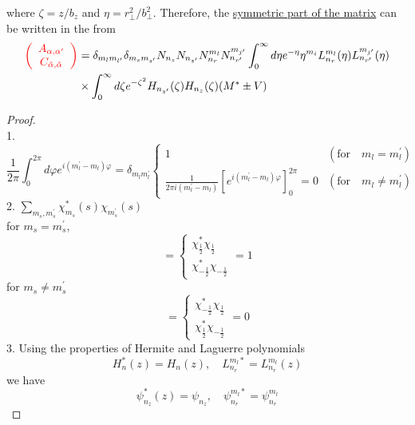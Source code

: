   where $\zeta = z/b_z$ and $\eta = r_{\perp}^2/b_{\perp}^2$. Therefore, the \underline{symmetric part of the matrix} can be written in the from
  \begin{equation}
    \begin{aligned}
      \textcolor{red}{\left(\begin{array}{c}
        A_{\alpha, \alpha^{\prime}} \\
        C_{\tilde{\alpha}, \tilde{\alpha}}
      \end{array}\right)} &=\delta_{m_{l} m_{l^{\prime}}} \delta_{m_{s} m_{s^{\prime}}} N_{n_{z}} N_{n_{z^{\prime}}} N_{n_{r}}^{m_{l}} N_{n_{r^{\prime}}}^{m_{j^{\prime}}} \int_{0}^{\infty} d \eta e^{-\eta} \eta^{m_{i}} L_{n_{r}}^{m_{l}}(\eta) L_{n_{r^{\prime}}}^{m_{j^{\prime}}}(\eta) \\
      & \times \int_{0}^{\infty} d \zeta e^{-\zeta^{2}} H_{n_{z^{\prime}}}(\zeta) H_{n_{z}}(\zeta)(M^\ast \pm V)
    \end{aligned}
  \end{equation}
  \begin{proof}
    \\1. 
    \begin{equation}
      \frac{1}{2\pi} \int_{0}^{2\pi} d\varphi e^{i(m_l^{\prime} - m_l)\varphi} = \delta_{m_l m_l^{\prime}}
      \begin{cases}
        1 & (\text{for} \quad m_l = m_l^{\prime})  \\
        \frac{1}{2\pi i(m_l^{\prime} - m_l)} \left[e^{i(m_l^{\prime} -m_l) \varphi}\right]_0^{2\pi}= 0 & (\text{for} \quad m_l \neq m_l^{\prime})
      \end{cases}
    \end{equation}
    2. $\sum_{m_s, m_{s}^\prime} \chi_{m_s}^{\ast}(s)\chi_{m_s^{\prime}}(s)$\\
    for $m_s = m_s^{\prime}$,
    \begin{equation}
      =
      \begin{cases}
        \chi_{\frac{1}{2}}^{\ast}\chi_{\frac{1}{2}} \\
        \chi_{-\frac{1}{2}}^{\ast}\chi_{-\frac{1}{2}}
      \end{cases}
      =1
    \end{equation}
    for $m_s \neq m_s^{\prime}$
    \begin{equation}
      =
      \begin{cases}
        \chi_{-\frac{1}{2}}^{\ast}\chi_{\frac{1}{2}} \\
        \chi_{\frac{1}{2}}^{\ast}\chi_{-\frac{1}{2}}
      \end{cases}
      =0
    \end{equation}
    3. Using the properties of Hermite and Laguerre polynomials
    \begin{equation*}
      H_n^{\ast}(z) = H_n(z), \quad L_{n_r}^{m_l\ast} = L_{n_r}^{m_l}(z)
    \end{equation*}
    we have
    \begin{equation*}
      \psi_{n_z}^{\ast}(z) = \psi_{n_z}, \quad \psi_{n_r}^{m_l\ast} = \psi_{n_r}^{m_l} 
    \end{equation*}
  \end{proof}

